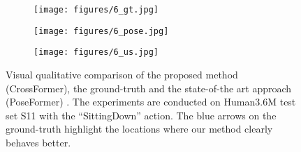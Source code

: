 \documentclass[runningheads]{llncs}
\begin{document}
\begin{figure}[t!]
{\begin{subfigure}{0.17\paperwidth}
\texttt{[image: figures/6\_gt.jpg]}\end{subfigure}
\begin{subfigure}{0.18\paperwidth}
\texttt{[image: figures/6\_pose.jpg]}\end{subfigure}
\begin{subfigure}{0.17\paperwidth}
\texttt{[image: figures/6\_us.jpg]}\end{subfigure}}
\caption{Visual qualitative comparison of the proposed method (CrossFormer), the ground-truth  and the state-of-the art approach (PoseFormer) \cite{poseformer}. The experiments are conducted on Human3.6M test set S11
with the ``SittingDown'' action. The blue arrows on the ground-truth highlight the locations where our method clearly behaves better.}
\label{fig:qualitative}\end{figure}
\end{document}

